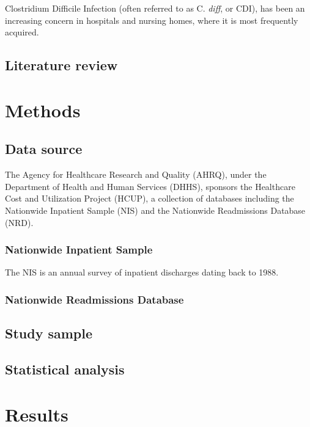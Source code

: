 \documentclass[12pt]{ociamthesis}\usepackage[]{graphicx}\usepackage[]{color}
\begin{document}
Clostridium Difficile Infection (often referred to as C. \textit{diff}, or CDI), 
has been an increasing concern in hospitals and nursing homes, where it is most frequently acquired.
\cite{Lamont2017}
\cite{Lessa2015}

\section{Literature review}

\lipsum

\chapter{Methods}


\section{Data source}

The Agency for Healthcare Research and Quality (AHRQ), under the Department of Health and Human Services (DHHS), sponsors the
Healthcare Cost and Utilization Project (HCUP), a collection of databases including the Nationwide Inpatient Sample (NIS) and
the Nationwide Readmissions Database (NRD). \cite{HCUPOverview}

\subsection{Nationwide Inpatient Sample}
The NIS is an annual survey of inpatient discharges dating back to 1988. 

\subsection{Nationwide Readmissions Database}

\section{Study sample}



\section{Statistical analysis}

\chapter{Results}
\end{document}
